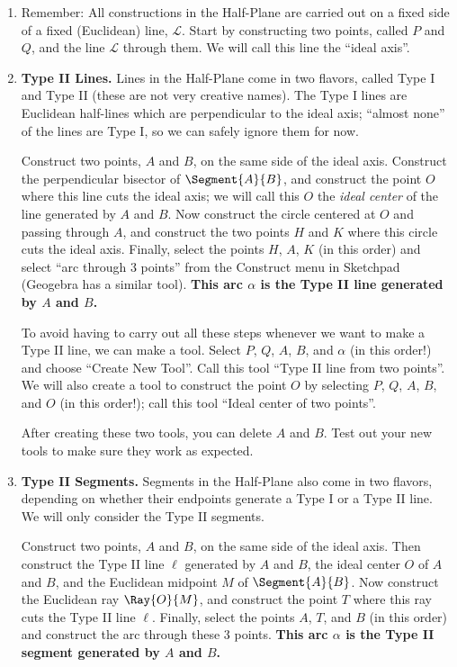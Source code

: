 \documentclass{article}
\begin{document}
\begin{enumerate}
\item Remember: All constructions in the Half-Plane are carried out on a fixed side of a fixed (Euclidean) line, $\mathcal{L}$. Start by constructing two points, called $P$ and $Q$, and the line $\mathcal{L}$ through them. We will call this line the ``ideal axis''.

\item \textbf{Type II Lines.} Lines in the Half-Plane come in two flavors, called Type I and Type II (these are not very creative names). The Type I lines are Euclidean half-lines which are perpendicular to the ideal axis; ``almost none'' of the lines are Type I, so we can safely ignore them for now.

Construct two points, $A$ and $B$, on the same side of the ideal axis. Construct the perpendicular bisector of $\Segment{A}{B}$, and construct the point $O$ where this line cuts the ideal axis; we will call this $O$ the \emph{ideal center} of the line generated by $A$ and $B$. Now construct the circle centered at $O$ and passing through $A$, and construct the two points $H$ and $K$ where this circle cuts the ideal axis. Finally, select the points $H$, $A$, $K$ (in this order) and select ``arc through 3 points'' from the Construct menu in Sketchpad (Geogebra has a similar tool). \textbf{This arc $\alpha$ is the Type II line generated by $A$ and $B$.}

To avoid having to carry out all these steps whenever we want to make a Type II line, we can make a tool. Select $P$, $Q$, $A$, $B$, and $\alpha$ (in this order!) and choose ``Create New Tool''. Call this tool ``Type II line from two points''. We will also create a tool to construct the point $O$ by selecting $P$, $Q$, $A$, $B$, and $O$ (in this order!); call this tool ``Ideal center of two points''.

After creating these two tools, you can delete $A$ and $B$. Test out your new tools to make sure they work as expected.



\item \textbf{Type II Segments.} Segments in the Half-Plane also come in two flavors, depending on whether their endpoints generate a Type I or a Type II line. We will only consider the Type II segments.

Construct two points, $A$ and $B$, on the same side of the ideal axis. Then construct the Type II line $\ell$ generated by $A$ and $B$, the ideal center $O$ of $A$ and $B$, and the Euclidean midpoint $M$ of $\Segment{A}{B}$. Now construct the Euclidean ray $\Ray{O}{M}$, and construct the point $T$ where this ray cuts the Type II line $\ell$. Finally, select the points $A$, $T$, and $B$ (in this order) and construct the arc through these 3 points. \textbf{This arc $\alpha$ is the Type II segment generated by $A$ and $B$.}


\end{enumerate}
\end{document}

